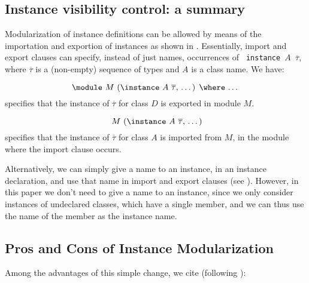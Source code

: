\subsection{Instance visibility control: a summary}
\label{subsec:instance-visibility-control}

Modularization of instance definitions can be allowed by means of the
importation and exportion of instances as shown in
\cite{Controlling-scope-instances}. Essentially, import and export
clauses can specify, instead of just names, occurrences of {\tt
  instance $A$ $\overline{\tau}$}, where $\overline{\tau}$ is a
(non-empty) sequence of types and $A$ is a class name.  We have:

  \[ \text{\module\ $M$ (\instance\ $A$ $\overline{\tau}$, \ldots) \where\ \ldots} \]
specifies that the instance of $\overline{\tau}$ for class $D$ is
exported in module $M$.

  \[ \text{\ $M$ (\instance\ $A$ $\overline{\tau}$, \ldots)} \]
specifies that the instance of $\overline{\tau}$ for class $A$ is
imported from $M$, in the module where the import clause occurs.

Alternatively, we can simply give a name to an instance, in an
instance declaration, and use that name in import and export clauses
(see \cite{Controlling-scope-instances}). However, in this paper we
don't need to give a name to an instance, since we only consider
instances of undeclared classes, which have a single member, and we
can thus use the name of the member as the instance name. 


\subsection{Pros and Cons of Instance Modularization}

Among the advantages of this simple change, we cite (following
\cite{Controlling-scope-instances}):

